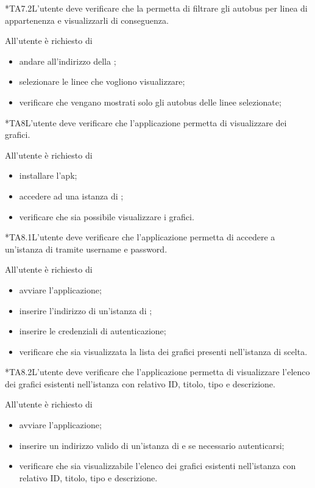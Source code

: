 	*{TA7.2}L'utente deve verificare che la  permetta di filtrare gli autobus per linea di appartenenza e visualizzarli di conseguenza.

		All'utente è richiesto di
		\begin{itemize}
			\item andare all'indirizzo della ;
			\item selezionare le linee che vogliono visualizzare;
			\item verificare che vengano mostrati solo gli autobus delle linee selezionate;
		\end{itemize}

	*{TA8}L'utente deve verificare che l'applicazione  permetta di visualizzare dei grafici.

		All'utente è richiesto di
		\begin{itemize}
			\item installare l'apk;
			\item accedere ad una istanza di \projectname{};
			\item verificare che sia possibile visualizzare i grafici.
		\end{itemize}

	*{TA8.1}L'utente deve verificare che l'applicazione  permetta di accedere a un'istanza di \projectname{} tramite username e password.

		All'utente è richiesto di
		\begin{itemize}
			\item avviare l'applicazione;
			\item inserire l'indirizzo di un'istanza di \projectname{};
			\item inserire le credenziali di autenticazione;
			\item verificare che sia visualizzata la lista dei grafici presenti nell'istanza di \projectname{} scelta.
		\end{itemize}

	*{TA8.2}L'utente deve verificare che l'applicazione  permetta di visualizzare l'elenco dei grafici esistenti nell'istanza \projectname{} con relativo ID, titolo, tipo e descrizione.

		All'utente è richiesto di
		\begin{itemize}
			\item avviare l'applicazione;
			\item inserire un indirizzo valido di un'istanza di \projectname{} e se necessario autenticarsi;
			\item verificare che sia visualizzabile l'elenco dei grafici esistenti nell'istanza \projectname{} con relativo ID, titolo, tipo e descrizione.
		\end{itemize}

